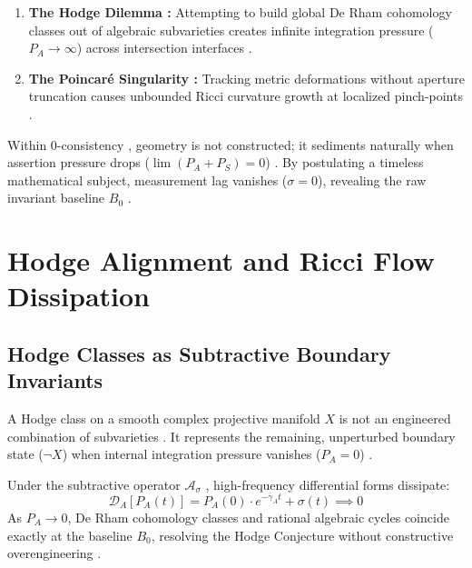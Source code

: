 \documentclass[11pt,a4paper]{article}
\begin{document}
\begin{enumerate}
    \item \textbf{The Hodge Dilemma \cite{hodge1950topological}:} Attempting to build global De Rham cohomology classes out of algebraic subvarieties creates infinite integration pressure ($P_A \to \infty$) across intersection interfaces \cite{poincare1908}.
    \item \textbf{The Poincaré Singularity \cite{poincare1904cinquieme}:} Tracking metric deformations without aperture truncation causes unbounded Ricci curvature growth at localized pinch-points \cite{poincare1890probleme, hamilton1982three}.
\end{enumerate}

Within $0$-consistency \cite{nicht_theory_monograph, nicht_metaphysics_paper_0}, geometry is not constructed; it sediments naturally when assertion pressure drops ($\lim (P_A + P_S) = 0$) \cite{nicht_physics_special_1}. By postulating a timeless mathematical subject, measurement lag vanishes ($\sigma = 0$), revealing the raw invariant baseline $B_0$ \cite{nicht_metaphysics_paper_1, nicht_metaphysics_paper_2}.

\section{Hodge Alignment and Ricci Flow Dissipation}

\subsection{Hodge Classes as Subtractive Boundary Invariants}
A Hodge class on a smooth complex projective manifold $X$ is not an engineered combination of subvarieties \cite{nicht_theory_monograph, hodge1950topological}. It represents the remaining, unperturbed boundary state ($\neg X$) when internal integration pressure vanishes ($P_A = 0$) \cite{nicht_metaphysics_paper_0}. 

Under the subtractive operator $\mathcal{A}_\sigma$ \cite{nicht_physics_special_1, apophatic_engine_pypi, apophatic_opt_pypi}, high-frequency differential forms dissipate:
\begin{equation}
\mathcal{D}_A[P_A(t)] = P_A(0) \cdot e^{-\gamma_A t} + \sigma(t) \implies 0
\end{equation}
As $P_A \to 0$, De Rham cohomology classes and rational algebraic cycles coincide exactly at the baseline $B_0$, resolving the Hodge Conjecture \cite{hodge1950topological} without constructive overengineering \cite{nicht_metaphysics_paper_1}.
\end{document}
